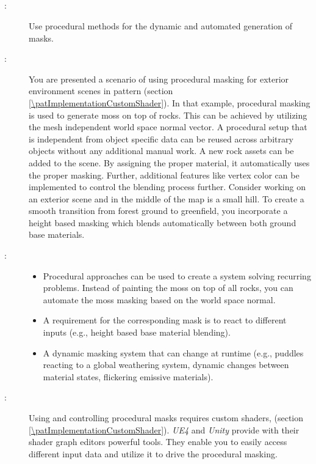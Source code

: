 \subsection{\patMaskingCreationProcedural}\label{\patMaskingCreationProcedural}
\begin{description}
	\item[\patIntent:]%
	Use procedural methods for the dynamic and automated generation of masks. 
	\item[\patMotivation:]%
	You are presented a scenario of using procedural masking for exterior environment scenes in pattern \emph{\patImplementationCustomShader} (section \ref{\patImplementationCustomShader}). In that example, procedural masking is used to generate moss on top of rocks. This can be achieved by utilizing the mesh independent world space normal vector. A procedural setup that is independent from object specific data can be reused across arbitrary objects without any additional manual work. A new rock assets can be added to the scene. By assigning the proper material, it automatically uses the proper masking. Further, additional features like vertex color can be implemented to control the blending process further. Consider working on an exterior scene and in the middle of the map is a small hill. To create a smooth transition from forest ground to greenfield, you incorporate a height based masking which blends automatically between both ground base materials. 
	\item[\patApplicability:]\hfill 
	\begin{itemize}\mynobreakpar
		\item Procedural approaches can be used to create a system solving recurring problems. Instead of painting the moss on top of all rocks, you can automate the moss masking based on the world space normal.
		\item A requirement for the corresponding mask is to react to different inputs (e.g., height based base material blending).
		\item A dynamic masking system that can change at runtime (e.g., puddles reacting to a global weathering system, dynamic changes between material states, flickering emissive materials).				
	\end{itemize}
	\item[\patImplementation:]%
	Using and controlling procedural masks requires custom shaders, \emph{\patImplementationCustomShader} (section \ref{\patImplementationCustomShader}). \emph{UE4} and \emph{Unity} provide with their shader graph editors powerful tools. They enable you to easily access different input data and utilize it to drive the procedural masking. 

\end{description}
